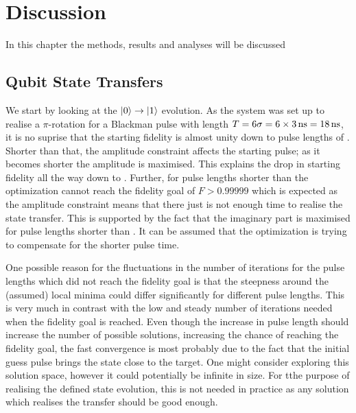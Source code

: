 \documentclass[main.tex]{subfiles}
\begin{document}
\chapter{Discussion}
In this chapter the methods, results and analyses will be discussed

\section{Qubit State Transfers}
We start by looking at the \(\ket{0}\rightarrow\ket{1}\) evolution.
As the system was set up to realise a \(\pi\)-rotation for a Blackman pulse with length \(T=6\sigma = 6\times\SI{3}{\nano\second} = \SI{18}{\nano\second}\), it is no suprise that the starting fidelity is almost unity down to pulse lengths of .
Shorter than that, the amplitude constraint affects the starting pulse; as it becomes shorter the amplitude is maximised.
This explains the drop in starting fidelity all the way down to .
Further, for pulse lengths shorter than  the optimization cannot reach the fidelity goal of \(F > 0.99999\) which is expected as the amplitude constraint means that there just is not enough time to realise the state transfer.
This is supported by the fact that the imaginary part is maximised for pulse lengths shorter than .
It can be assumed that the optimization is trying to compensate for the shorter pulse time.

One possible reason for the fluctuations in the number of iterations for the pulse lengths which did not reach the fidelity goal is that the steepness around the (assumed) local minima could differ significantly for different pulse lengths.
This is very much in contrast with the low and steady number of iterations needed when the fidelity goal is reached.
Even though the increase in pulse length should increase the number of possible solutions, increasing the chance of reaching the fidelity goal, the fast convergence is most probably due to the fact that the initial guess pulse brings the state close to the target.
One might consider exploring this solution space, however it could potentially be infinite in size.
For tthe purpose of realising the defined state evolution, this is not needed in practice as any solution which realises the transfer should be good enough.
\end{document}
